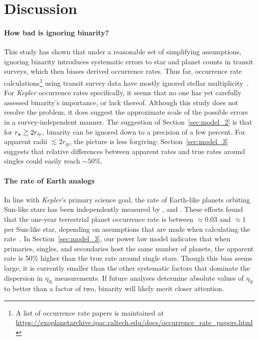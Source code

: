 \documentclass[12pt,modern]{aastex61}
\renewcommand{\a}{_{\rm a}}
\begin{document}
%

\section{Discussion}
\label{sec:discussion}


\paragraph{How bad is ignoring binarity?}
This study has shown that under a reasonable set of simplifying assumptions, 
ignoring binarity introduces systematic errors to star and planet counts in 
transit surveys, which then biases derived occurrence rates.
Thus far, occurrence rate calculations\footnote{
    A list of occurrence rate papers is maintained at 
    \url{https://exoplanetarchive.ipac.caltech.edu/docs/occurrence_rate_papers.html}
} using transit survey data have mostly ignored stellar 
multiplicity~\citep[\textit{e.g.},][]{howard_planet_2012,fressin_false_2013,foreman-mackey_exoplanet_2014,dressing_occurrence_2015,burke_terrestrial_2015}.
For {\it Kepler} occurrence rates specifically, 
it seems that no one has yet carefully assessed binarity's importance, or lack 
thereof.
Although this study does not resolve the problem, it does suggest the 
approximate scale of the possible errors in a survey-independent manner.
The suggestion of Section~\ref{sec:model_2} is that for $r\a \gtrsim 2r_\oplus$, 
binarity can be ignored down to a precision of a few percent.
For apparent radii $\lesssim 2r_\oplus$, the picture is less forgiving:
Section~\ref{sec:model_3} suggests that relative differences between apparent 
rates 
and true rates around singles could easily reach $\sim\! 50\%$.

\paragraph{The rate of Earth analogs}
In line with {\it Kepler}'s primary science goal, the rate of Earth-like 
planets orbiting Sun-like stars has been independently measured by 
\citet{youdin_exoplanet_2011,petigura_prevalence_2013,dong_fast_2013,
    foreman-mackey_exoplanet_2014}, and \citet{burke_terrestrial_2015}.
These efforts found that the one-year terrestrial planet occurrence rate 
is between $\approx\! 0.03$ and $\approx\!1$ per Sun-like star,
depending on assumptions that are made when calculating the
rate~\citep[see][Figure~17]{burke_terrestrial_2015}.
In Section~\ref{sec:model_3}, our power law model indicates that when 
primaries, 
singles, and secondaries host the same number of planets, the apparent rate is 
50\% higher than the true rate around single stars.
Though this bias seems large, it is currently smaller than the other 
systematic factors that dominate the dispersion in $\eta_\oplus$ 
measurements.
If future analyses determine absolute values of $\eta_\oplus$ to 
better than a factor of two, binarity will likely merit closer attention.
\end{document}
